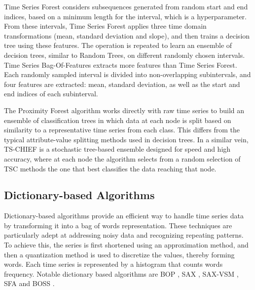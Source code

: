 Time Series Forest \cite{deng2013time} considers subsequences generated from random start and end indices, based on a minimum length for the interval, which is a hyperparameter. From these intervals, Time Series Forest applies three time domain transformations (mean, standard deviation and slope), and then trains a decision tree using these features. The operation is repeated to learn an ensemble of decision trees, similar to Random Trees, on different randomly chosen intervals.
Time Series Bag-Of-Features \cite{baydogan2013bag} extracts more features than Time Series Forest. Each randomly sampled interval is divided into non-overlapping subintervals, and four features are extracted: mean, standard deviation, as well as the start and end indices of each subinterval.

The Proximity Forest algorithm \cite{lucas2019proximity} works directly with raw time series to  build an ensemble of classification trees in which data at each node is split based on similarity to a representative time series from each class. This differs from the typical attribute-value splitting methods used in decision trees.
In a similar vein, TS-CHIEF \cite{shifaz2020ts} is a stochastic tree-based ensemble designed for speed and high accuracy, where at each node the algorithm selects from a random selection of TSC methods the one that best classifies the data reaching that node.


\subsection{Dictionary-based Algorithms}

Dictionary-based algorithms provide an efficient way to handle time series data by transforming it into a bag of words representation. These techniques are particularly adept at addressing noisy data and recognizing repeating patterns. To achieve this, the series is first shortened using an approximation method, and then a quantization method is used to discretize the values, thereby forming words. Each time series is represented by a histogram that counts words frequency. Notable dictionary based algorithms are BOP \cite{lin2012rotation}, SAX \cite{lin2003symbolic}, SAX-VSM \cite{senin2013sax}, SFA \cite{schafer2012sfa} and BOSS \cite{schafer2015boss}. 






